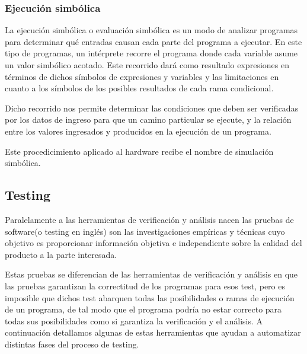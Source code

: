 \subsubsection*{Ejecuci\'on simb\'olica}
\label{ap2:sec:SE}

La ejecuci\'on simb\'olica o evaluaci\'on simb\'olica es un modo de analizar programas para determinar qu\'e entradas causan cada parte del programa a ejecutar. En este tipo de programas, un int\'erprete recorre el programa donde cada variable asume un valor simb\'olico acotado. Este recorrido dar\'a como resultado expresiones en t\'erminos de dichos s\'imbolos de expresiones y variables y las limitaciones en cuanto a los s\'imbolos de los posibles resultados de cada rama condicional. 

Dicho recorrido nos permite determinar las condiciones que deben ser verificadas por los datos de ingreso para que un camino particular se ejecute, y la relaci\'on entre los valores ingresados y producidos en la ejecuci\'on de un programa. 

Este procedicimiento aplicado al hardware recibe el nombre de simulaci\'on simb\'olica.


\subsection{Testing}
\label{ap1:sec:testing}

Paralelamente a las herramientas de verificaci\'on y an\'alisis nacen las pruebas de software(o testing en ingl\'es) son las investigaciones emp\'iricas y t\'ecnicas cuyo objetivo es proporcionar informaci\'on objetiva e independiente sobre la calidad del producto a la parte interesada.

Estas pruebas se diferencian de las herramientas de verificaci\'on y an\'alisis en que las pruebas garantizan la correctitud de los programas para esos test, pero es imposible que dichos test abarquen todas las posibilidades o ramas de ejecuci\'on de un programa, de tal modo que el programa podr\'ia no estar correcto para todas sus posibilidades como si garantiza la verificaci\'on y el an\'alisis. A continuaci\'on detallamos algunas de estas herramientas que ayudan a automatizar distintas fases del proceso de testing.

